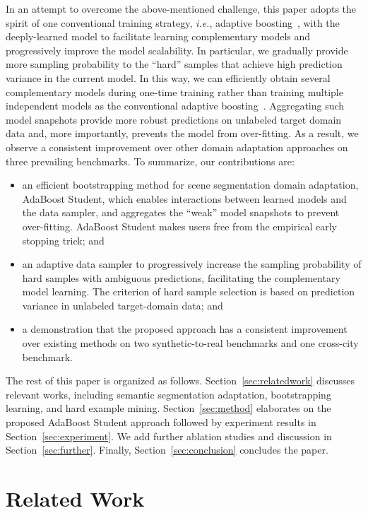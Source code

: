 \documentclass[journal]{IEEEtran}
\def\ie{\emph{i.e.}}
\begin{document}
In an attempt to overcome the above-mentioned challenge, this paper adopts the spirit of one conventional training strategy, \ie, adaptive boosting~\cite{freund1996experiments}, with the deeply-learned model to facilitate learning complementary models and progressively improve the model scalability. 
In particular, we gradually provide more sampling probability to the ``hard'' samples that achieve high prediction variance in the current model. In this way, we can efficiently obtain several complementary models during one-time training rather than training multiple independent models as the conventional adaptive boosting~\cite{freund1996experiments}. 
Aggregating such model snapshots provide more robust predictions on unlabeled target domain data and, more importantly, prevents the model from over-fitting. 
As a result, we observe a consistent improvement over other domain adaptation approaches on three prevailing benchmarks. 
To summarize, our contributions are: 
\begin{itemize}
    \item an efficient bootstrapping method for scene segmentation domain adaptation, AdaBoost Student, which enables interactions between learned models and the data sampler, and aggregates the ``weak'' model snapshots to prevent over-fitting. AdaBoost Student makes users free from the empirical early stopping trick; and
    \item an adaptive data sampler to progressively increase the sampling probability of hard samples with ambiguous predictions, facilitating the complementary model learning. The criterion of hard sample selection is based on prediction variance in unlabeled target-domain data; and 
    \item a demonstration that the proposed approach has a consistent improvement over existing methods on two synthetic-to-real benchmarks and one cross-city benchmark.
\end{itemize}
The rest of this paper is organized as follows. Section~\ref{sec:relatedwork} discusses relevant works, including semantic segmentation adaptation, bootstrapping learning, and hard example mining. Section~\ref{sec:method} elaborates on the proposed AdaBoost Student approach followed by experiment results in Section~\ref{sec:experiment}. We add further ablation studies and discussion in Section~\ref{sec:further}. Finally, Section~\ref{sec:conclusion} concludes the paper.

\section{Related Work}~\label{sec:relatedwork}
\end{document}
